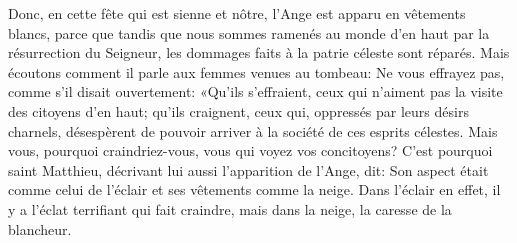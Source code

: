 Donc, en cette fête qui est sienne et nôtre,
	l’Ange est apparu en vêtements blancs,
	parce que tandis que nous sommes ramenés au monde d’en haut
		par la résurrection du Seigneur,
	les dommages faits à la patrie céleste sont réparés.
Mais écoutons comment il parle aux femmes venues au tombeau:
	Ne vous effrayez pas, comme s’il disait ouvertement:
	«Qu’ils s’effraient, ceux qui n’aiment pas la visite des citoyens d’en haut;
	qu’ils craignent, ceux qui, oppressés par leurs désirs charnels,
	désespèrent de pouvoir arriver à la société de ces esprits célestes.
Mais vous, pourquoi craindriez-vous, vous qui voyez vos concitoyens?
C’est pourquoi saint Matthieu, décrivant lui aussi l’apparition de l’Ange, dit:
	Son aspect était comme celui de l’éclair et ses vêtements comme la neige.
Dans l’éclair en effet, il y a l’éclat terrifiant qui fait craindre,
	mais dans la neige, la caresse de la blancheur.

